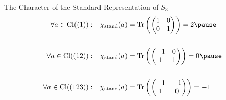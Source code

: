 
\begin{frame}{The Character of the Standard Representation of $S_3$}
    \large
   \begin{align*}
    \forall a \in \Cl((1)): \quad & \chi_{\stand}(a) = \Tr\left(
        \begin{pmatrix}
            1 & 0 \\
            0 & 1
        \end{pmatrix}
    \right) = 2 \pause \\\\
    \forall a \in \Cl((12)): \quad & \chi_{\stand}(a) = \Tr\left(
        \begin{pmatrix}
            -1 & 0 \\
            1 & 1
        \end{pmatrix}
    \right) = 0 \pause \\\\
    \forall a \in \Cl((123)): \quad & \chi_{\stand}(a) = \Tr\left(
        \begin{pmatrix}
            -1 & -1 \\
            1 & 0
        \end{pmatrix}
    \right) = -1
   \end{align*} 
\end{frame}

